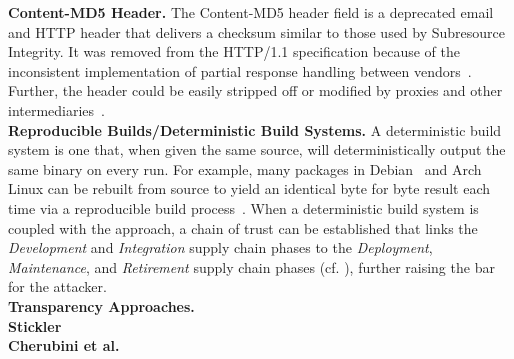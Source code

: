 \noindent\textbf{Content-MD5 Header.} The Content-MD5 header field is a
deprecated email and HTTP header that delivers a checksum similar to those used
by Subresource Integrity. It was removed from the HTTP/1.1 specification because
of the inconsistent implementation of partial response handling between
vendors~\cite{HTTP1.1}. Further, the header could be easily stripped off or
modified by proxies and other intermediaries~\cite{MD5Header}. \\

\noindent\textbf{Reproducible Builds/Deterministic Build Systems.} A
deterministic build system is one that, when given the same source, will
deterministically output the same binary on every run. For example, many
packages in Debian~\cite{ReproBuildsDebian} and Arch Linux can be rebuilt from
source to yield an identical byte for byte result each time via a reproducible
build process~\cite{ReproBuilds}. When a deterministic build system is coupled
with the \SYSTEM{} approach, a chain of trust can be established that links the
\emph{Development} and \emph{Integration} supply chain phases to the
\emph{Deployment}, \emph{Maintenance}, and \emph{Retirement} supply chain phases
(cf. ), further raising the bar for the attacker. \\

\noindent\textbf{Transparency Approaches.}  \\

\noindent\textbf{Stickler}  \\

\noindent\textbf{Cherubini et al.} 
